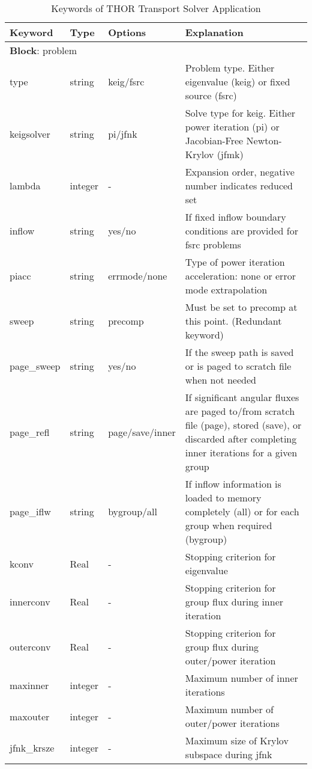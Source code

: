 \begin{table}[p]
    \centering
    \caption{Keywords of THOR Transport Solver Application\label{tab:thor_solver_parameters_1}}
    \begin{tabular}{l l l l}
        \toprule
        Keyword & Type & Options & Explanation\\
        \midrule
        \multicolumn{4}{l}{\textbf{Block}: problem}\\
            type    &  string  &  keig/fsrc & Problem type. Either eigenvalue (keig) or fixed source (fsrc) \\
            keigsolver & string & pi/jfnk  & Solve type for keig. Either power iteration (pi) or Jacobian-Free Newton-Krylov (jfmk) \\
            lambda & integer & - & Expansion order, negative number indicates reduced set \\
            inflow & string  & yes/no & If fixed inflow boundary conditions are provided for fsrc problems\\
            piacc & string & errmode/none & Type of power iteration acceleration: none or error mode extrapolation \\
            sweep & string & precomp & Must be set to precomp at this point. (Redundant keyword)\\
            page\_sweep & string & yes/no & If the sweep path is saved or is paged to scratch file when not needed\\
            page\_refl & string & page/save/inner & If significant angular fluxes are paged to/from scratch file (page), stored (save), or discarded after completing inner iterations for a given group\\
            page\_iflw & string  & bygroup/all & If inflow information is loaded to memory completely (all) or for each group when required (bygroup)\\
            kconv & Real & - & Stopping criterion for eigenvalue\\
            innerconv & Real & - & Stopping criterion for group flux during inner iteration \\
            outerconv & Real & - & Stopping criterion for group flux during outer/power iteration \\
            maxinner & integer & - & Maximum number of inner iterations \\
            maxouter & integer & - & Maximum number of outer/power iterations \\
            jfnk\_krsze & integer & - & Maximum size of Krylov subspace during jfnk \\

\end{tabular}
\end{table}
